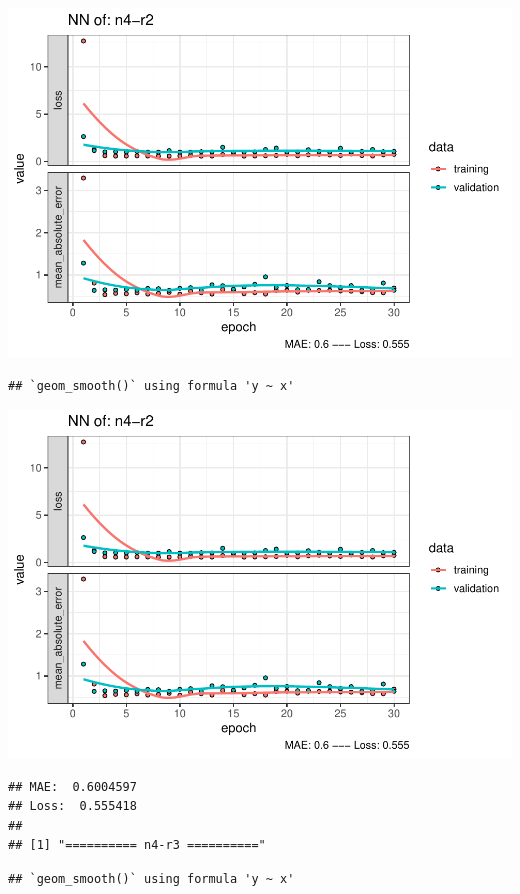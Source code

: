 \documentclass[
]{article}
\begin{document}
\includegraphics{project-code_files/figure-latex/unnamed-chunk-18-31.pdf}

\begin{verbatim}
## `geom_smooth()` using formula 'y ~ x'
\end{verbatim}

\includegraphics{project-code_files/figure-latex/unnamed-chunk-18-32.pdf}

\begin{verbatim}
## MAE:  0.6004597
## Loss:  0.555418 
## 
## [1] "========== n4-r3 =========="
\end{verbatim}

\begin{verbatim}
## `geom_smooth()` using formula 'y ~ x'
\end{verbatim}
\end{document}
